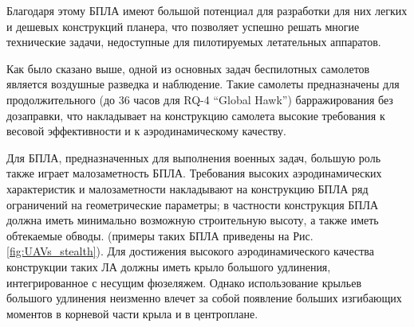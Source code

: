 

Благодаря этому БПЛА имеют большой потенциал для разработки для них легких и дешевых конструкций планера, что позволяет успешно решать многие технические задачи, недоступные для пилотируемых летательных аппаратов.







Как было сказано выше, одной из основных задач беспилотных самолетов является воздушные разведка и наблюдение. Такие самолеты предназначены для продолжительного (до 36 часов для RQ-4 ``Global Hawk'') барражирования без дозаправки, что накладывает на конструкцию самолета высокие требования к весовой эффективности и к аэродинамическому качеству.




Для БПЛА, предназначенных для выполнения военных задач, большую роль также играет малозаметность БПЛА. Требования высоких аэродинамических характеристик и малозаметности накладывают на конструкцию БПЛА ряд ограничений на геометрические параметры; в частности конструкция БПЛА должна иметь минимально возможную строительную высоту, а также иметь обтекаемые обводы. (примеры таких БПЛА приведены на Рис.\ref{fig:UAVs_stealth}). Для достижения высокого аэродинамического качества конструкции таких ЛА должны иметь крыло большого удлинения, интегрированное с несущим фюзеляжем. Однако использование крыльев большого удлинения неизменно влечет за собой появление больших изгибающих моментов в корневой части крыла и в центроплане. 



